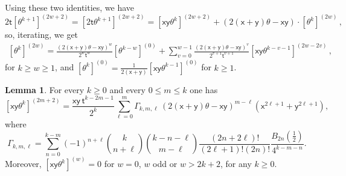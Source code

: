 \documentclass[11pt]{article}
\theoremstyle{definition}
\newtheorem{lemma}[definition]{Lemma}
\begin{document}
Using these two identities, we have
$$
2\mathsf{t}[\theta^{k+1}]^{(2w+2)} =[2\mathsf{t}\theta^{k+1}]^{(2w+2)} = [\mathsf{x}\mathsf{y}\theta^k]^{(2w+2)}+(2(\mathsf{x}+\mathsf{y})\theta-\mathsf{x}\mathsf{y})\cdot [\theta^{k}]^{(2w)}\,,
$$
so, iterating, we get
\begin{align}\label{eq:theta-recursion}
[\theta^{k}]^{(2w)} =\frac{(2(\mathsf{x}+\mathsf{y})\theta - \mathsf{x}\mathsf{y})^{w}}{2^{w}\mathsf{t}^{w}}[\theta^{k-w}]^{(0)}+\sum_{v=0}^{w-1}\frac{(2(\mathsf{x}+\mathsf{y})\theta - \mathsf{x}\mathsf{y})^v}{2^{v+1}\mathsf{t}^{v+1}}[\mathsf{x}\mathsf{y}\theta^{k-v-1}]^{(2w-2v)}\, ,
\end{align}
for $k\ge w \geq 1$, and $[\theta^k]^{(0)} = \frac{1}{2(\mathsf{x}+\mathsf{y})}[\mathsf{x}\mathsf{y}\theta^{k-1}]^{(0)}$ for $k \geq 1$.

\begin{lemma}\label{lem:weight-pieces-xytheta}
For every $k\geq 0$ and every $0\leq m\leq k$ one has
\begin{equation}\label{eq:weight-piece-q-basis}
 [\mathsf{x}\mathsf{y}\theta^k]^{(2m+2)}
 =
 \frac{\mathsf{x}\mathsf{y}\,\mathsf{t}^{k-2m-1}}{2^k}
 \sum_{\ell=0}^{m}
 \Gamma_{k,m,\ell}\,
 (2(\mathsf{x}+\mathsf{y})\theta-\mathsf{x}\mathsf{y})^{m-\ell}(\mathsf{x}^{2\ell+1}+\mathsf{y}^{2\ell+1}),
\end{equation}
where
$$
 \Gamma_{k,m,\ell}
 =
 \sum_{n=0}^{k-m}
 (-1)^{n+\ell}
 \binom{k}{n+\ell}
 \binom{k-n-\ell}{m-\ell}
 \frac{(2n+2\ell)!}{(2\ell+1)!(2n)!}
 \frac{B_{2n}\!\left(\frac12\right)}{4^{k-m-n}}.
$$
Moreover, $[\mathsf{x}\mathsf{y}\theta^k]^{(w)}=0$ for $w=0$, $w$ odd or $w >2k+2$, for any $k \geq 0$.
\end{lemma}
\end{document}
